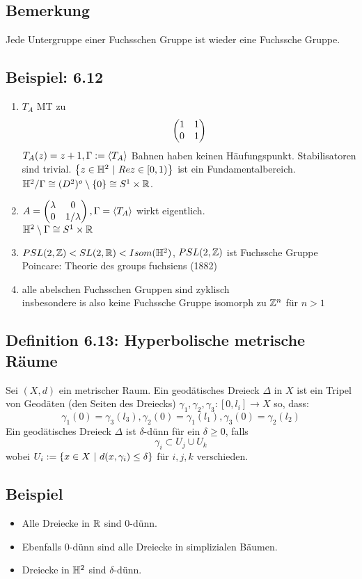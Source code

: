 \documentclass{article}
\begin{document}
\subsection{Bemerkung}
Jede Untergruppe einer Fuchsschen Gruppe ist wieder eine Fuchssche Gruppe.

\subsection{Beispiel: 6.12}
\begin{enumerate}
	\item $T_A$ MT zu 
	\[\left(\begin{matrix} 1 & 1\\ 0 & 1 \end{matrix}\right) \]
	$T_A(z) = z +1, \Gamma:= \grp{T_A}{}$
	Bahnen haben keinen Häufungspunkt. Stabilisatoren sind trivial. $\set{z \in \H^2}{Re z \in [0,1)}$ ist ein Fundamentalbereich. $\mathbb{H}^2 / \Gamma \cong (D^2)^o\setminus\{0\} \cong S^1\times \mathbb{R}$.
	
	\item $A = \Matrix{\lambda}{0}{0}{1/\lambda}, \Gamma = \grp{T_A}{}$ wirkt eigentlich.\\
	$\mathbb{H}^2\setminus \Gamma \cong S^1\times \mathbb{R}$
	
	\item $PSL(2, \mathbb{Z}) < SL(2, \mathbb{R}) < Isom (\mathbb{H}^2)$, $PSL(2, \mathbb{Z})$ ist Fuchssche Gruppe\\
	Poincare: Theorie des groups fuchsiens (1882)
	
	\item alle abelschen Fuchsschen Gruppen sind zyklisch\\
	insbesondere is also keine Fuchssche Gruppe isomorph zu $\mathbb{Z}^n$ für $n > 1$
\end{enumerate}

\subsection{Definition 6.13: Hyperbolische metrische Räume}
Sei $(X,d)$ ein metrischer Raum. Ein geodätisches Dreieck $\Delta$ in $X$ ist ein Tripel von Geodäten (den Seiten des Dreiecks) $\gamma_1, \gamma_2,\gamma_3 : [0,l_i] \rightarrow X$ so, dass:
\[\gamma_1(0) = \gamma_3(l_3), \gamma_2(0) = \gamma_1(l_1), \gamma_3(0) = \gamma_2(l_2)\]
Ein geodätisches Dreieck $\Delta$ ist $\delta$-dünn für ein $\delta \geq 0$, falls
\[\gamma_i \subset U_j\cup U_k \]
wobei $U_i := \set{x \in X}{d(x, \gamma_i) \leq \delta}$ für $i,j,k$ verschieden.

\subsection{Beispiel}
\begin{itemize}
	\item Alle Dreiecke in $\mathbb{R}$ sind 0-dünn.
	\item Ebenfalls 0-dünn sind alle Dreiecke in simplizialen Bäumen.
	\item Dreiecke in $\mathbb{H}^2$ sind $\delta$-dünn.
\end{itemize}
\end{document}
